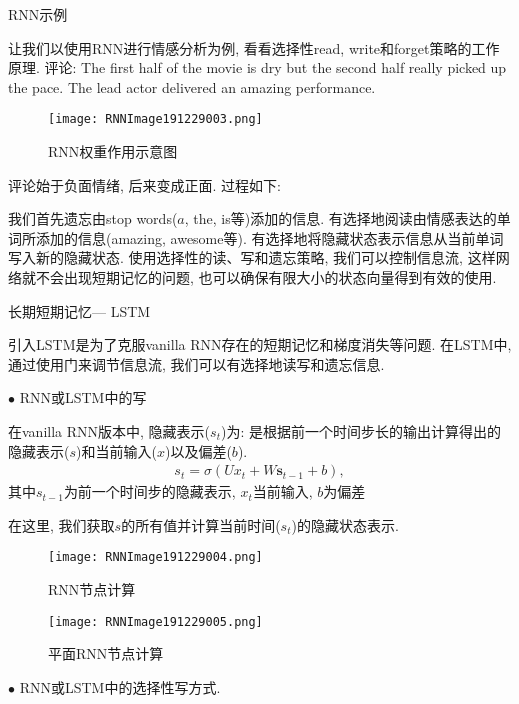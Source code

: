 \begin{example}RNN示例

让我们以使用RNN进行情感分析为例, 看看选择性read, write和forget策略的工作原理.
评论: The first half of the movie is dry but the second half really picked up the pace. The lead actor delivered an amazing performance.
\begin{figure}[H]
\centering
\texttt{[image: RNNImage191229003.png]}
\caption{RNN权重作用示意图}
\label{RNNImage191229003}
\vspace{-0.4cm}
\end{figure}
评论始于负面情绪, 后来变成正面. 过程如下:

我们首先遗忘由stop words($a$, the, is等)添加的信息. 有选择地阅读由情感表达的单词所添加的信息(amazing, awesome等). 有选择地将隐藏状态表示信息从当前单词写入新的隐藏状态.
使用选择性的读、写和遗忘策略, 我们可以控制信息流, 这样网络就不会出现短期记忆的问题, 也可以确保有限大小的状态向量得到有效的使用.

长期短期记忆— LSTM

引入LSTM是为了克服vanilla RNN存在的短期记忆和梯度消失等问题. 在LSTM中, 通过使用门来调节信息流, 我们可以有选择地读写和遗忘信息.

$\bullet$ RNN或LSTM中的写

在vanilla RNN版本中, 隐藏表示($s_t$)为: 是根据前一个时间步长的输出计算得出的隐藏表示($s$)和当前输入($x$)以及偏差($b$).
\begin{align}
  s_{t}=\sigma\left(U x_{t}+W \mathbf{s}_{t-1}+b\right),
\end{align}
其中$s_{t-1}$为前一个时间步的隐藏表示, $x_t$当前输入, $b$为偏差

在这里, 我们获取$s$的所有值并计算当前时间($s_t$)的隐藏状态表示.
\begin{figure}[H]
\centering
\texttt{[image: RNNImage191229004.png]}
\caption{RNN节点计算}
\label{RNNImage191229004}\vspace{-0.4cm}
\end{figure}
\begin{figure}[H]
\centering
\texttt{[image: RNNImage191229005.png]}
\caption{平面RNN节点计算}
\label{RNNImage191229005}\vspace{-0.4cm}
\end{figure}

$\bullet$ RNN或LSTM中的选择性写方式.


\end{example}
